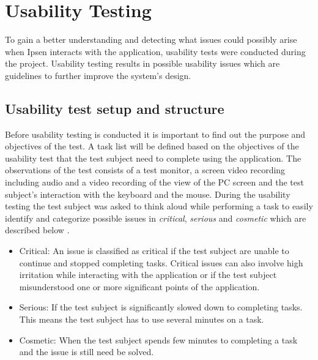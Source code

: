 \section{Usability Testing} \label{sec:usabilitytesting}

To gain a better understanding and detecting what issues could possibly arise when Ipsen interacts with the application, usability tests were conducted during the project.
Usability testing results in possible usability issues which are guidelines to further improve the system's design.

\subsection{Usability test setup and structure}
Before usability testing is conducted it is important to find out the purpose and objectives of the test.
A task list will be defined based on the objectives of the usability test that the test subject need to complete using the application. The observations of the test consists of a test monitor, a screen video recording including audio and a video recording of the view of the PC screen and the test subject's interaction with the keyboard and the mouse.
During the usability testing the test subject was asked to think aloud while performing a task to easily identify and categorize possible issues in \textit{critical}, \textit{serious} and \textit{cosmetic} which are described below \citep[p.~154]{brugervenligtwebdesign}.

\begin{itemize}
  \item Critical: An issue is classified as critical if the test subject are unable to continue and stopped completing tasks.
Critical issues can also involve high irritation while interacting with the application or if the test subject misunderstood one or more significant points of the application.
  \item Serious: If the test subject is significantly slowed down to completing tasks.
This means the test subject has to use several minutes on a task.
	\item Cosmetic: When the test subject spends few minutes to completing a task and the issue is still need be solved. %
\end{itemize}


